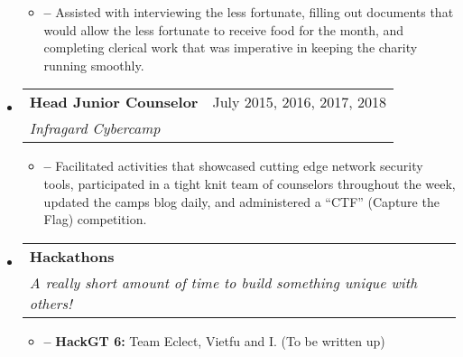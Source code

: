 \documentclass[letterpaper,10pt,draft]{article}
\makeatletter
\newcommand{\resitem}[1]{\item[] \textbf{--} #1 \vspace{-2pt}}
\newcommand{\ressubheading}[3]{
\begin{tabular*}{6.5in}{l@{\cftdotfill{\cftsecdotsep}\extracolsep{\fill}}r}
		\textbf{#1} & #3\\
		\textit{#2} \\
\end{tabular*}\vspace{-6pt}}
\makeatother
\begin{document}
\begin{itemize}
		\begin{itemize}

			\resitem{Assisted with interviewing the less fortunate, filling out documents that would allow the less fortunate to receive food for the month, and completing clerical work that was imperative in keeping the charity running smoothly.}

		\end{itemize}
	\item[] 
		\ressubheading{Head Junior Counselor}{Infragard Cybercamp}{July 2015, 2016, 2017, 2018}

		\begin{itemize}

			\resitem{Facilitated activities that showcased cutting edge network security tools, participated in a tight knit team of counselors throughout the week, updated the camps blog daily, and administered a “CTF” (Capture the Flag) competition.}

		\end{itemize}

\end{itemize}



\begin{itemize}	
	\item[]
		\ressubheading{Hackathons}{A really short amount of time to build something unique with others!}{}
		\begin{itemize}
			\resitem{{\bf HackGT 6:} Team Eclect, Vietfu and I. (To be written up)	}
		\end{itemize}
\end{itemize}
\end{document}
